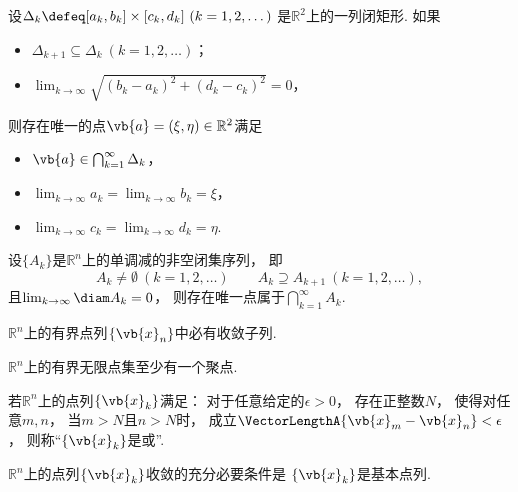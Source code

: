 \begin{theorem}[闭矩形套定理]
设\(\Delta_k \defeq [a_k,b_k]\times[c_k,d_k]\ (k=1,2,\dotsc)\)
是\(\mathbb{R}^2\)上的一列闭矩形.
如果\begin{itemize}
	\item \(\Delta_{k+1} \subseteq \Delta_k\ (k=1,2,\dotsc)\)；
	\item \(\lim_{k\to\infty} \sqrt{(b_k-a_k)^2+(d_k-c_k)^2} = 0\)，
\end{itemize}
则存在唯一的点\(\vb{a}=(\xi,\eta)\in\mathbb{R}^2\)满足\begin{itemize}
	\item \(\vb{a}\in\bigcap_{k=1}^\infty \Delta_k\)，
	\item \(\lim_{k\to\infty} a_k = \lim_{k\to\infty} b_k = \xi\)，
	\item \(\lim_{k\to\infty} c_k = \lim_{k\to\infty} d_k = \eta\).
\end{itemize}
\end{theorem}
\begin{theorem}
设\(\{A_k\}\)是\(\mathbb{R}^n\)上的单调减的非空闭集序列，
即\begin{equation*}
	A_k\neq\emptyset\ (k=1,2,\dotsc)
	\qquad
	A_k \supseteq A_{k+1}\ (k=1,2,\dotsc),
\end{equation*}
且\(\lim_{k\to\infty} \diam A_k = 0\)，
则存在唯一点属于\(\bigcap_{k=1}^\infty A_k\).
\end{theorem}

\begin{theorem}
\(\mathbb{R}^n\)上的有界点列\(\{\vb{x}_n\}\)中必有收敛子列.
\end{theorem}
\begin{corollary}
\(\mathbb{R}^n\)上的有界无限点集至少有一个聚点.
\end{corollary}
\begin{definition}
若\(\mathbb{R}^n\)上的点列\(\{\vb{x}_k\}\)满足：
对于任意给定的\(\epsilon>0\)，
存在正整数\(N\)，
使得对任意\(m,n\)，
当\(m>N\)且\(n>N\)时，
成立\(\VectorLengthA{\vb{x}_m-\vb{x}_n}<\epsilon\)，
则称“\(\{\vb{x}_k\}\)是或”.
\end{definition}
\begin{theorem}
\(\mathbb{R}^n\)上的点列\(\{\vb{x}_k\}\)收敛的充分必要条件是
\(\{\vb{x}_k\}\)是基本点列.
\end{theorem}

